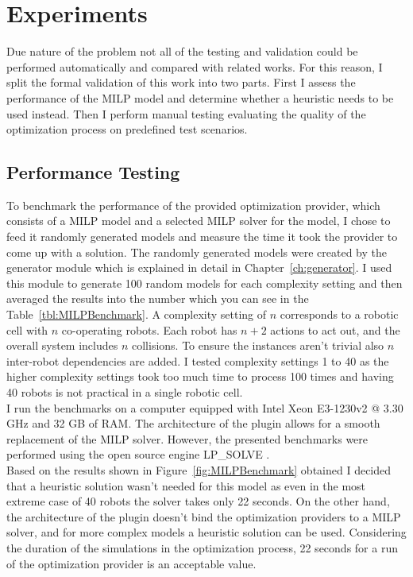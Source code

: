 \chapter{Experiments}
\label{ch:experiments}
\graphicspath{{chapters/Experiments/}}

Due nature of the problem not all of the testing and validation could be performed automatically and compared with related works. 
For this reason, I split the formal validation of this work into two parts. 
First I assess the performance of the MILP model and determine whether a heuristic needs to be used instead. 
Then I perform manual testing evaluating the quality of the optimization process on predefined test scenarios.

\section{Performance Testing}

To benchmark the performance of the provided optimization provider, which consists of a MILP model and a selected MILP solver for the model, I chose to feed it randomly generated models and measure the time it took the provider to come up with a solution. 
The randomly generated models were created by the generator module which is explained in detail in Chapter~\ref{ch:generator}. 
I used this module to generate 100 random models for each complexity setting and then averaged the results into the number which you can see in the Table~\ref{tbl:MILPBenchmark}.
A complexity setting of $n$ corresponds to a robotic cell with $n$ co-operating robots. Each robot has $n + 2$ actions to act out, and the overall system includes $n$ collisions. To ensure the instances aren't trivial also $n$ inter-robot dependencies are added. 
I tested complexity settings 1 to 40 as the higher complexity settings took too much time to process 100 times and having 40 robots is not practical in a single robotic cell. \\

I run the benchmarks on a computer equipped with Intel Xeon E3-1230v2 @ 3.30 GHz \cite{BeastCPUIntelARK} and 32 GB of RAM. 
The architecture of the plugin allows for a smooth replacement of the MILP solver. 
However, the presented benchmarks were performed using the open source engine LP\_SOLVE \cite{LPSolve}. \\

Based on the results shown in Figure~\ref{fig:MILPBenchmark} obtained I decided that a heuristic solution wasn't needed for this model as even in the most extreme case of 40 robots the solver takes only 22 seconds.
On the other hand, the architecture of the plugin doesn't bind the optimization providers to a MILP solver, and for more complex models a heuristic solution can be used.
Considering the duration of the simulations in the optimization process, 22 seconds for a run of the optimization provider is an acceptable value.


